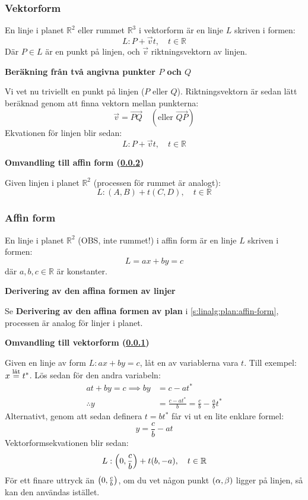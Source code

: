 \subsubsection{Vektorform}\label{s:linalg:linje:vektor-form}
En linje i planet $\mathbb{R}^2$ eller rummet $\mathbb{R}^3$ i vektorform är en linje $L$ skriven i formen:
$$
	L:P+\vec{v}t,\quad t\in\mathbb{R}
$$
Där $P\in L$ är en punkt på linjen, och $\vec{v}$ riktningsvektorn av linjen.

\begin{ber}
\textbf{Beräkning från två angivna punkter $P$ och $Q$}

Vi vet nu triviellt en punkt på linjen ($P$ eller $Q$).
Riktningsvektorn är sedan lätt beräknad genom att finna vektorn mellan punkterna:
$$
	\vec{v}=\overrightarrow{PQ}\quad(\text{eller }\overrightarrow{QP})
$$
Ekvationen för linjen blir sedan:
$$
	L:P+\vec{v}t,\quad t\in\mathbb{R}
$$
\end{ber}

\begin{omv}
\textbf{Omvandling till affin form (\ref{s:linalg:linje:affin-form})}

Given linjen i planet $\mathbb{R}^2$ (processen för rummet är analogt):
$$
	L:(A,B)+t(C,D),\quad t\in\mathbb{R}
$$
\end{omv}

\subsubsection{Affin form}\label{s:linalg:linje:affin-form}
En linje i planet $\mathbb{R}^2$ (OBS, inte rummet!) i affin form är en linje $L$ skriven i formen:
$$
	L=ax+by=c
$$
där $a,b,c\in\mathbb{R}$ är konstanter.


\begin{der}
	\textbf{Derivering av den affina formen av linjer}

	Se \textbf{Derivering av den affina formen av plan} i \ref{s:linalg:plan:affin-form},
	processen är analog för linjer i planet.
\end{der}

\begin{omv}
\textbf{Omvandling till vektorform (\ref{s:linalg:linje:vektor-form})}

Given en linje av form $L:ax+by=c$, låt en av variablerna vara $t$.
Till exempel: $x\leteq t^*$. Lös sedan för den andra variabeln:
\begin{align*}
	at+by=c\implies by&=c-at^*\\
	\therefore y&=\frac{c-at^*}{b}=\frac{c}{b}-\frac{a}{b}t^*
\end{align*}
Alternativt, genom att sedan definera $t=bt^*$ får vi ut en lite enklare formel:
$$
	y=\frac{c}{b}-at
$$
Vektorformsekvationen blir sedan:
$$
	L:\qty(0,\frac{c}{b})+t(b,-a),\quad t\in\mathbb{R}
$$
För ett finare uttryck än $\qty(0,\frac{c}{b})$, om du vet någon punkt $\qty(\alpha,\beta)$
ligger på linjen, så kan den användas istället.
\end{omv}

